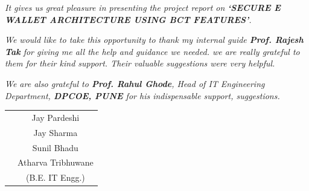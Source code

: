\documentclass[oneside,a4paper,12pt]{report}
\begin{document}

{   }

\textit{It gives us great pleasure in presenting the project report on {\bfseries \fontsize{12}{12} \selectfont `SECURE E WALLET ARCHITECTURE USING BCT FEATURES'}.}
\vspace*{1.5\baselineskip}

 \textit{We would like to take this opportunity to thank my internal guide \textbf{Prof. Rajesh Tak} for giving me all the help and guidance we needed. we are really grateful to them for their kind support. Their valuable suggestions were very helpful.} \vspace*{1.5\baselineskip}

 \textit{We are also grateful to \textbf{Prof. Rahul Ghode}, Head of IT Engineering Department, \textbf{DPCOE, PUNE} for his indispensable support, suggestions.}
 \vspace*{3\baselineskip} \\
\begin{tabular}{p{8.2cm}c}
& Jay Pardeshi \\
& Jay Sharma \\
& Sunil Bhadu \\
& Atharva Tribhuwane \\
&(B.E. IT Engg.)
\end{tabular}
{}




{  }
\end{document}
